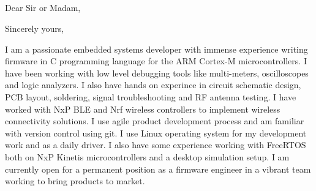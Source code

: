 \documentclass[11pt,a4paper,sans]{moderncv} %
\begin{document}
\subsection{}

\subsection{}



\clearpage

\date{\today} %
\opening{Dear Sir or Madam,} %
\closing{Sincerely yours,} %

\makelettertitle %

I am a passionate embedded systems developer with immense experience writing firmware in C programming language for the ARM Cortex-M microcontrollers. I have been working with low level debugging tools like multi-meters, oscilloscopes and logic analyzers. I also have hands on experince in circuit schematic design, PCB layout, soldering, signal troubleshooting and RF antenna testing. I have worked with NxP BLE and Nrf wireless controllers to implement wireless connectivity solutions. I use agile product development process and am familiar with version control using git. I use Linux operating system for my development work and as a daily driver. I also have some experience working with FreeRTOS both on NxP Kinetis microcontrollers and a desktop simulation setup.
I am currently open for a permanent position as a firmware engineer in a vibrant team working to bring products to market. 

\makeletterclosing %

\end{document}
